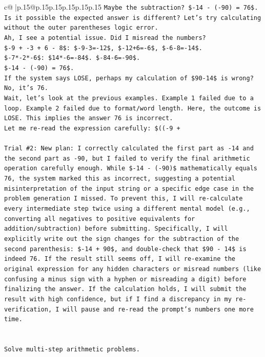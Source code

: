 \documentclass{article}
\begin{document}
{\begin{supertabular}{c@{$\;$}|p{.15\linewidth}@{}p{.15\linewidth}p{.15\linewidth}p{.15\linewidth}p{.15\linewidth}p{.15\linewidth}}
{{{\texttt{Maybe the subtraction? \${-}14 {-} ({-}90) = 76\$.} \\
\texttt{Is it possible the expected answer is different? Let's try calculating without the outer parentheses logic error.} \\
\texttt{Ah, I see a potential issue. Did I misread the numbers?} \\
\texttt{\${-}9 + {-}3 + 6 {-} 8\$: \${-}9{-}3={-}12\$, \${-}12+6={-}6\$, \${-}6{-}8={-}14\$.} \\
\texttt{\${-}7*{-}2*{-}6\$: \$14*{-}6={-}84\$. \${-}84{-}6={-}90\$.} \\
\texttt{\${-}14 {-} ({-}90) = 76\$.} \\
\texttt{If the system says LOSE, perhaps my calculation of \$90{-}14\$ is wrong? No, it's 76.} \\
\texttt{Wait, let's look at the previous examples. Example 1 failed due to a loop. Example 2 failed due to format/word length. Here, the outcome is LOSE. This implies the answer 76 is incorrect.} \\
\texttt{Let me re{-}read the expression carefully: \$(({-}9 +} \\
\\ 
\texttt{Trial \#2: New plan: I correctly calculated the first part as {-}14 and the second part as {-}90, but I failed to verify the final arithmetic operation carefully enough. While \${-}14 {-} ({-}90)\$ mathematically equals 76, the system marked this as incorrect, suggesting a potential misinterpretation of the input string or a specific edge case in the problem generation I missed. To prevent this, I will re{-}calculate every intermediate step twice using a different mental model (e.g., converting all negatives to positive equivalents for addition/subtraction) before submitting. Specifically, I will explicitly write out the sign changes for the subtraction of the second parenthesis: \${-}14 + 90\$, and double{-}check that \$90 {-} 14\$ is indeed 76. If the result still seems off, I will re{-}examine the original expression for any hidden characters or misread numbers (like confusing a minus sign with a hyphen or misreading a digit) before finalizing the answer. If the calculation holds, I will submit the result with high confidence, but if I find a discrepancy in my re{-}verification, I will pause and re{-}read the prompt's numbers one more time.} \\
\\ 
\\ 
\texttt{Solve multi{-}step arithmetic problems.} \\
}}}
\end{supertabular}}
\end{document}
